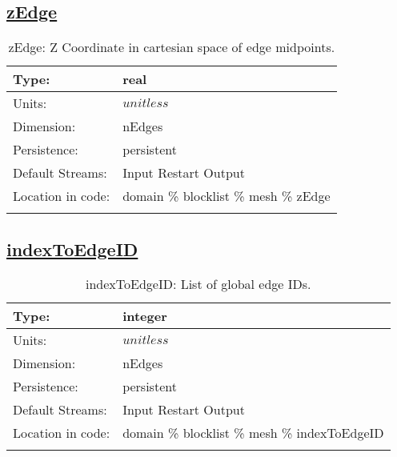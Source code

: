\subsection[zEdge]{\hyperref[sec:var_tab_mesh]{zEdge}}
\label{subsec:var_sec_mesh_zEdge}
\begin{center}
\begin{longtable}{| p{2.0in} | p{4.0in} |}
        \hline 
        Type: & real \\
        \hline 
        Units: & $unitless$ \\
        \hline 
        Dimension: & nEdges \\
        \hline 
        Persistence: & persistent \\
        \hline 
		 Default Streams: & Input Restart Output  \\
        \hline 
		 Location in code: & domain \% blocklist \% mesh \% zEdge \\
		 \hline 
    \caption{zEdge: Z Coordinate in cartesian space of edge midpoints.}
\end{longtable}
\end{center}
\subsection[indexToEdgeID]{\hyperref[sec:var_tab_mesh]{indexToEdgeID}}
\label{subsec:var_sec_mesh_indexToEdgeID}
\begin{center}
\begin{longtable}{| p{2.0in} | p{4.0in} |}
        \hline 
        Type: & integer \\
        \hline 
        Units: & $unitless$ \\
        \hline 
        Dimension: & nEdges \\
        \hline 
        Persistence: & persistent \\
        \hline 
		 Default Streams: & Input Restart Output  \\
        \hline 
		 Location in code: & domain \% blocklist \% mesh \% indexToEdgeID \\
		 \hline 
    \caption{indexToEdgeID: List of global edge IDs.}
\end{longtable}
\end{center}
